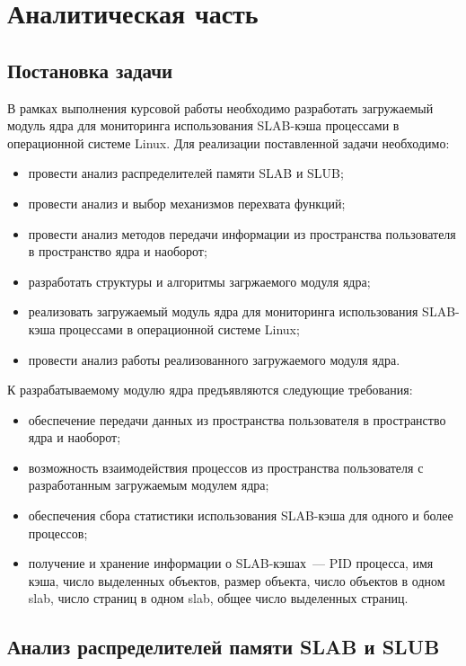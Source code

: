 \chapter{Аналитическая часть}

\section{Постановка задачи}

В рамках выполнения курсовой работы необходимо разработать загружаемый модуль ядра для мониторинга использования SLAB-кэша процессами в операционной системе Linux.
Для реализации поставленной задачи необходимо:
\begin{itemize}
	\item провести анализ распределителей памяти SLAB и SLUB;
	\item провести анализ и выбор механизмов перехвата функций;
	\item провести анализ методов передачи информации из пространства пользователя в пространство ядра и наоборот;
	\item разработать структуры и алгоритмы загржаемого модуля ядра;
	\item реализовать загружаемый модуль ядра для мониторинга использования SLAB-кэша процессами в операционной системе Linux;
	\item провести анализ работы реализованного загружаемого модуля ядра.
\end{itemize}

К разрабатываемому модулю ядра предъявляются следующие требования:
\begin{itemize}
	\item обеспечение передачи данных из пространства пользователя в пространство ядра и наоборот;
	\item возможность взаимодействия процессов из пространства пользователя с разработанным загружаемым модулем ядра;
	\item обеспечения сбора статистики использования SLAB-кэша для одного и более процессов;
	\item получение и хранение информации о SLAB-кэшах~--- PID процесса, имя кэша, число выделенных объектов, размер объекта, число объектов в одном slab, число страниц в одном slab, общее число выделенных страниц.
\end{itemize}

\section{Анализ распределителей памяти SLAB и SLUB}

